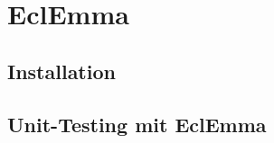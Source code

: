%
%
\chapter{EclEmma}\label{ch:eclemma}
	\section{Installation}\label{s:installation}
	\section{Unit-Testing mit EclEmma}\label{s:unittestingmiteclemma}
